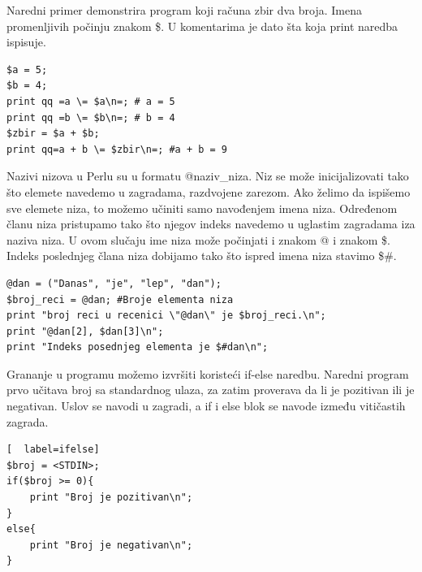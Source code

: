 \documentclass[a4paper]{article}
\begin{document}
Naredni primer demonstrira program koji računa zbir dva broja. Imena promenljivih počinju znakom \$. U komentarima je dato šta koja print naredba ispisuje.
\begin{lstlisting}[label = zbir]
$a = 5;
$b = 4;
print qq =a \= $a\n=; # a = 5
print qq =b \= $b\n=; # b = 4
$zbir = $a + $b;
print qq=a + b \= $zbir\n=; #a + b = 9
\end{lstlisting}
Nazivi nizova u Perlu su u formatu @naziv\_niza. Niz se može inicijalizovati tako što elemete navedemo u zagradama, razdvojene zarezom. Ako želimo da ispišemo sve elemete niza, to možemo učiniti samo navođenjem imena niza. Određenom članu niza pristupamo tako što njegov indeks navedemo u uglastim zagradama iza naziva niza. U ovom slučaju ime niza može počinjati i znakom @ i znakom \$. Indeks poslednjeg člana niza dobijamo tako što ispred imena niza stavimo \$\#.
\begin{lstlisting}[label=niz]
@dan = ("Danas", "je", "lep", "dan"); 
$broj_reci = @dan; #Broje elementa niza
print "broj reci u recenici \"@dan\" je $broj_reci.\n";
print "@dan[2], $dan[3]\n";
print "Indeks posednjeg elementa je $#dan\n";
\end{lstlisting}
Grananje u programu možemo izvršiti koristeći if-else naredbu. Naredni program prvo učitava broj sa standardnog ulaza, za zatim proverava da li je pozitivan ili je negativan. Uslov se navodi u zagradi, a if i else blok se navode između vitičastih zagrada.
\begin{lstlisting}[  label=ifelse]
$broj = <STDIN>;
if($broj >= 0){
    print "Broj je pozitivan\n";
}
else{
    print "Broj je negativan\n";
}
\end{lstlisting}
\end{document}
